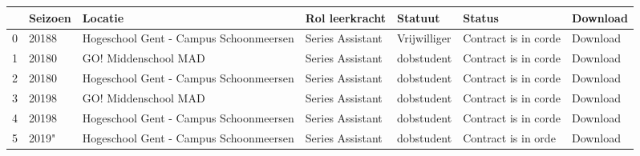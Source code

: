 \begin{tabular}{lllllll}
\toprule
{} & Seizoen &                                 Locatie &    Rol leerkracht &       Statuut &                Status &  Download \\
\midrule
0 &   20188 &  Hogeschool Gent - Campus Schoonmeersen &  Series Assistant &  Vrijwilliger &  Contract is in corde &  Download \\
1 &   20180 &                    GO! Middenschool MAD &  Series Assistant &    dobstudent &  Contract is in corde &  Download \\
2 &   20180 &  Hogeschool Gent - Campus Schoonmeersen &  Series Assistant &    dobstudent &  Contract is in corde &  Download \\
3 &   20198 &                    GO! Middenschool MAD &  Series Assistant &    dobstudent &  Contract is in corde &  Download \\
4 &   20198 &  Hogeschool Gent - Campus Schoonmeersen &  Series Assistant &    dobstudent &  Contract is in corde &  Download \\
5 &   2019" &  Hogeschool Gent - Campus Schoonmeersen &  Series Assistant &    dobstudent &   Contract is in orde &  Download \\
\bottomrule
\end{tabular}
